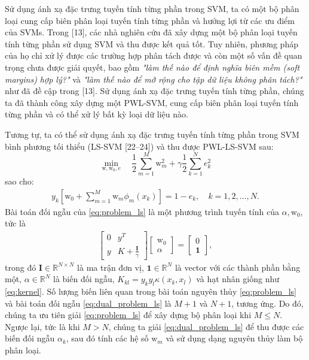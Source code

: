 Sử dụng ánh xạ đặc trưng tuyến tính từng phần trong SVM, ta có một bộ phân loại cung cấp biên phân loại tuyến tính từng phần và hưởng lợi từ các ưu điểm của SVMs. Trong [13], các nhà nghiên cứu đã xây dựng một bộ phân loại tuyến tính từng phần sử dụng SVM và thu được kết quả tốt. Tuy nhiên, phương pháp của họ chỉ xử lý được các trường hợp phân tách được và còn một số vấn đề quan trọng chưa được giải quyết, bao gồm \textit{"làm thế nào để định nghĩa biên mềm (soft margins) hợp lý?"} và \textit{"làm thế nào để mở rộng cho tập dữ liệu không phân tách?"} như đã đề cập trong [13]. Sử dụng ánh xạ đặc trưng tuyến tính từng phần, chúng ta đã thành công xây dựng một PWL-SVM, cung cấp biên phân loại tuyến tính từng phần và có thể xử lý bất kỳ loại dữ liệu nào.

Tương tự, ta có thể sử dụng ánh xạ đặc trưng tuyến tính từng phần trong SVM bình phương tối thiểu (LS-SVM [22–24]) và thu được PWL-LS-SVM sau:
\[
\min_{\text{w}, \text{w}_0, e} \quad \frac{1}{2} \sum_{m=1}^{M} \text{w}_m^2 + \gamma \frac{1}{2} \sum_{k=1}^{N} e_k^2
\]
sao cho:
\begin{align}
    y_k \left[ \text{w}_0 + \sum_{m=1}^{M} \text{w}_m \phi_m(x_k) \right] = 1 - e_k, \quad k = 1, 2, \ldots, N.
    \label{eq:problem_ls}
\end{align}
Bài toán đối ngẫu của \eqref{eq:problem_ls} là một phương trình tuyến tính của \( \alpha, \text{w}_0 \), tức là
\begin{align}
    \begin{bmatrix}
    0 & y^T \\
    y & K + \frac{\mathbf{I}}{\gamma}
    \end{bmatrix}
    \begin{bmatrix}
    \text{w}_0 \\
    \alpha
    \end{bmatrix}
    =
    \begin{bmatrix}
    0 \\
    \mathbf{1}
    \end{bmatrix},
    \label{eq:dual_problem_ls}
\end{align}
trong đó \( \mathbf{I} \in \mathbb{R}^{N \times N} \) là ma trận đơn vị, \( \mathbf{1} \in \mathbb{R}^N \) là vector với các thành phần bằng một, \( \alpha \in \mathbb{R}^N \) là biến đối ngẫu, \( K_{kl} = y_k y_l \kappa(x_k, x_l) \) và hạt nhân giống như \eqref{eq:kernel}. Số lượng biến liên quan trong bài toán nguyên thủy \eqref{eq:problem_ls} và bài toán đối ngẫu \eqref{eq:dual_problem_ls} là \( M + 1 \) và \( N + 1 \), tương ứng. Do đó, chúng ta ưu tiên giải \eqref{eq:problem_ls} để xây dựng bộ phân loại khi \( M \leq N \). Ngược lại, tức là khi \( M > N \), chúng ta giải \eqref{eq:dual_problem_ls} để thu được các biến đối ngẫu \( \alpha_k \), sau đó tính các hệ số \( \text{w}_m \) và sử dụng dạng nguyên thủy làm bộ phân loại.
